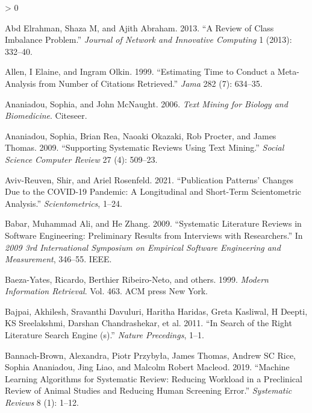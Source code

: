 \documentclass{article}
\newlength{\cslhangindent}
\newenvironment{CSLReferences}[2] %
 {%
  \setlength{\parindent}{0pt}
  \ifodd #1 \everypar{\setlength{\hangindent}{\cslhangindent}}\ignorespaces\fi
  \ifnum #2 > 0
  \setlength{\parskip}{#2\baselineskip}
  \fi
 }%
 {}
\begin{document}
\hypertarget{refs}{}
\begin{CSLReferences}{1}{0}
\leavevmode\hypertarget{ref-abd2013review}{}%
Abd Elrahman, Shaza M, and Ajith Abraham. 2013. {``A Review of Class
Imbalance Problem.''} \emph{Journal of Network and Innovative Computing}
1 (2013): 332--40.

\leavevmode\hypertarget{ref-allen1999estimating}{}%
Allen, I Elaine, and Ingram Olkin. 1999. {``Estimating Time to Conduct a
Meta-Analysis from Number of Citations Retrieved.''} \emph{Jama} 282
(7): 634--35.

\leavevmode\hypertarget{ref-ananiadou2006text}{}%
Ananiadou, Sophia, and John McNaught. 2006. \emph{Text Mining for
Biology and Biomedicine}. Citeseer.

\leavevmode\hypertarget{ref-ananiadou2009supporting}{}%
Ananiadou, Sophia, Brian Rea, Naoaki Okazaki, Rob Procter, and James
Thomas. 2009. {``Supporting Systematic Reviews Using Text Mining.''}
\emph{Social Science Computer Review} 27 (4): 509--23.

\leavevmode\hypertarget{ref-aviv2021publication}{}%
Aviv-Reuven, Shir, and Ariel Rosenfeld. 2021. {``Publication Patterns'
Changes Due to the COVID-19 Pandemic: A Longitudinal and Short-Term
Scientometric Analysis.''} \emph{Scientometrics}, 1--24.

\leavevmode\hypertarget{ref-babar2009systematic}{}%
Babar, Muhammad Ali, and He Zhang. 2009. {``Systematic Literature
Reviews in Software Engineering: Preliminary Results from Interviews
with Researchers.''} In \emph{2009 3rd International Symposium on
Empirical Software Engineering and Measurement}, 346--55. IEEE.

\leavevmode\hypertarget{ref-baeza1999modern}{}%
Baeza-Yates, Ricardo, Berthier Ribeiro-Neto, and others. 1999.
\emph{Modern Information Retrieval}. Vol. 463. ACM press New York.

\leavevmode\hypertarget{ref-bajpai2011search}{}%
Bajpai, Akhilesh, Sravanthi Davuluri, Haritha Haridas, Greta Kasliwal, H
Deepti, KS Sreelakshmi, Darshan Chandrashekar, et al. 2011. {``In Search
of the Right Literature Search Engine (s).''} \emph{Nature Precedings},
1--1.

\leavevmode\hypertarget{ref-bannach2019machine}{}%
Bannach-Brown, Alexandra, Piotr Przybyła, James Thomas, Andrew SC Rice,
Sophia Ananiadou, Jing Liao, and Malcolm Robert Macleod. 2019.
{``Machine Learning Algorithms for Systematic Review: Reducing Workload
in a Preclinical Review of Animal Studies and Reducing Human Screening
Error.''} \emph{Systematic Reviews} 8 (1): 1--12.


\end{CSLReferences}
\end{document}
